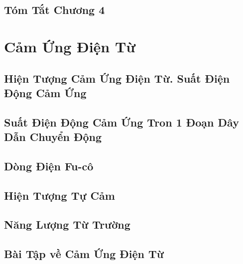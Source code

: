 \documentclass[oneside]{book}
\numberwithin{equation}{section}
\begin{document}
\section{Tóm Tắt Chương 4}


\chapter{Cảm Ứng Điện Từ}

\section{Hiện Tượng Cảm Ứng Điện Từ. Suất Điện Động Cảm Ứng}


\section{Suất Điện Động Cảm Ứng Tron 1 Đoạn Dây Dẫn Chuyển Động}


\section{Dòng Điện Fu-cô}


\section{Hiện Tượng Tự Cảm}


\section{Năng Lượng Từ Trường}


\section{Bài Tập về Cảm Ứng Điện Từ}
\end{document}
